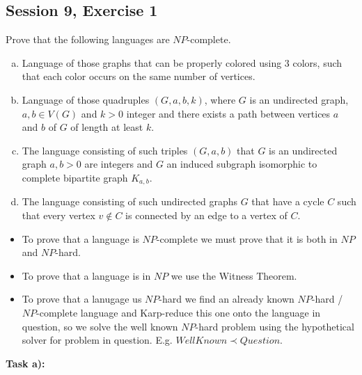 \subsection {Session 9, Exercise 1}


Prove that the following languages are $NP$-complete.
\begin{enumerate}[a)]
    \item Language of those graphs that can be properly colored using $3$ colors, such that each color occurs
on the same number of vertices.
    \item Language of those quadruples $(G,a,b,k)$, where $G$ is an undirected graph, $a,b\in{}V(G)$ and $k > 0$
integer and there exists a path between vertices $a$ and $b$ of $G$ of length at least $k$.
    \item The language consisting of such triples $(G,a,b)$ that $G$ is an undirected graph $a,b > 0$ are integers
and $G$ an induced subgraph isomorphic to complete bipartite graph $K_{a,b}$.
    \item The language consisting of such undirected graphs $G$ that have a cycle $C$ such that every vertex $v \notin{} C$ is connected by an edge to a vertex of $C$.
\end{enumerate}


\begin{itemize}
\item To prove that a language is $NP$-complete we must prove that it is both in $NP$ and $NP$-hard.
\item To prove that a language is in $NP$ we use the Witness Theorem.
\item To prove that a lanugage us $NP$-hard we find an already known $NP$-hard / $NP$-complete language and Karp-reduce this one onto the language in question, so we solve the well known $NP$-hard problem using the hypothetical solver for problem in question. E.g. $WellKnown \prec Question$.
\end{itemize}

\textbf{Task a):}

